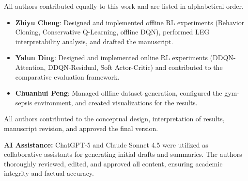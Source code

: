 
All authors contributed equally to this work and are listed in alphabetical order.

\begin{itemize}
    \item \textbf{Zhiyu Cheng}: Designed and implemented offline RL experiments (Behavior Cloning, Conservative Q-Learning, offline DQN), performed LEG interpretability analysis, and drafted the manuscript.

    \item \textbf{Yalun Ding}: Designed and implemented online RL experiments (DDQN-Attention, DDQN-Residual, Soft Actor-Critic) and contributed to the comparative evaluation framework.

    \item \textbf{Chuanhui Peng}: Managed offline dataset generation, configured the gym-sepsis environment, and created visualizations for the results.
\end{itemize}

All authors contributed to the conceptual design, interpretation of results, manuscript revision, and approved the final version.

\textbf{AI Assistance:} ChatGPT-5 and Claude Sonnet 4.5 were utilized as collaborative assistants for generating initial drafts and summaries. The authors thoroughly reviewed, edited, and approved all content, ensuring academic integrity and factual accuracy.
